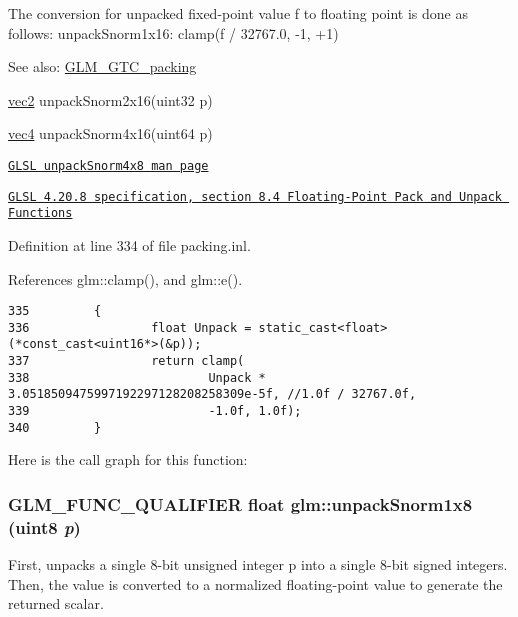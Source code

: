 The conversion for unpacked fixed-point value f to floating point is done as follows: unpackSnorm1x16: clamp(f / 32767.0, -1, +1)

\begin{Desc}
\item[See also:]\hyperlink{group__gtc__packing}{GLM\_\-GTC\_\-packing} 

\hyperlink{group__core__types_ga1618f51db67eaa145db101d8c8431d8}{vec2} unpackSnorm2x16(uint32 p) 

\hyperlink{group__core__types_g5881b1b022d7fd1b7218f5916532dd02}{vec4} unpackSnorm4x16(uint64 p) 

\href{http://www.opengl.org/sdk/docs/manglsl/xhtml/unpackSnorm1x16.xml}{\tt GLSL unpackSnorm4x8 man page} 

\href{http://www.opengl.org/registry/doc/GLSLangSpec.4.20.8.pdf}{\tt GLSL 4.20.8 specification, section 8.4 Floating-Point Pack and Unpack Functions} \end{Desc}


Definition at line 334 of file packing.inl.

References glm::clamp(), and glm::e().

\begin{Code}\begin{verbatim}335         {
336                 float Unpack = static_cast<float>(*const_cast<uint16*>(&p));
337                 return clamp(
338                         Unpack * 3.0518509475997192297128208258309e-5f, //1.0f / 32767.0f, 
339                         -1.0f, 1.0f);
340         }
\end{verbatim}
\end{Code}




Here is the call graph for this function:\hypertarget{group__gtc__packing_g6f2bebf536fbf7c8b97d4b306bb3354e}{
\subsubsection[unpackSnorm1x8]{\setlength{\rightskip}{0pt plus 5cm}GLM\_\-FUNC\_\-QUALIFIER float glm::unpackSnorm1x8 (uint8 {\em p})}}
\label{group__gtc__packing_g6f2bebf536fbf7c8b97d4b306bb3354e}


First, unpacks a single 8-bit unsigned integer p into a single 8-bit signed integers. Then, the value is converted to a normalized floating-point value to generate the returned scalar.

